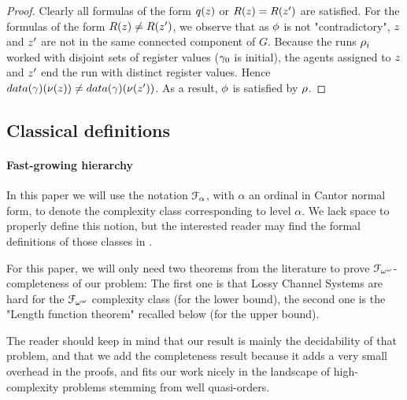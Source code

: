\begin{proof}
	
	Clearly all formulas of the form $q(\varz)$ or $R(\varz) = R(\varz')$ are satisfied.
	For the formulas of the form $R(\varz) \neq R(\varz')$, we observe that as $\phi$ is not "contradictory", $\varz$ and $\varz'$ are not in the same connected component of $G$. Because the runs $\rho_i$ worked with disjoint sets of register values ($\gamma_0$ is initial), the agents assigned to $\varz$ and $\varz'$ end the run with distinct register values.
	Hence $\data{\config}(\nu(\varz)) \neq \data{\config}(\nu(\varz'))$. As a result, $\phi$ is satisfied by $\rho$.
\end{proof}
\fi
\fi


\subsection{Classical definitions}

\paragraph*{Fast-growing hierarchy}

In this paper we will use the notation $\mathcal{F}_{\alpha}$, with $\alpha$ an ordinal in Cantor normal form, to denote the complexity class corresponding to level $\alpha$.
We lack space to properly define this notion, but the interested reader may find the formal definitions of those classes in .

For this paper, we will only need two theorems from the literature to prove $\mathcal{F}_{\omega^\omega}$-completeness of our problem: The first one is that Lossy Channel Systems are hard for the $\mathcal{F}_{\omega^\omega}$ complexity class (for the lower bound), the second one is the "Length function theorem" recalled below (for the upper bound). 

The reader should keep in mind that our result is mainly the decidability of that problem, and that we add the completeness result because it adds a very small overhead in the proofs, and fits our work nicely in the landscape of high-complexity problems stemming from well quasi-orders.

